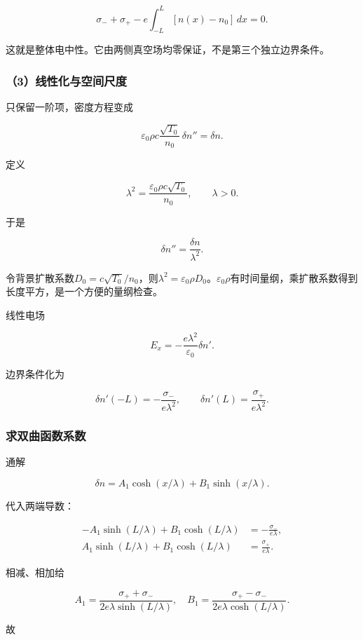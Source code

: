\documentclass[12pt,a4paper,fontset=fandol]{ctexart}
\begin{document}
\[
\sigma_-+\sigma_+-e\int_{-L}^L[n(x)-n_0]\,dx=0.
\]

这就是整体电中性。它由两侧真空场均零保证，不是第三个独立边界条件。

\subsubsection{（3）线性化与空间尺度}\label{ux7ebfux6027ux5316ux4e0eux7a7aux95f4ux5c3aux5ea6}

只保留一阶项，密度方程变成

\[
\varepsilon_0\rho c\frac{\sqrt{T_0}}{n_0}\,
\delta n''=\delta n.
\]

定义

\[
\boxed{
\lambda^2=\frac{\varepsilon_0\rho c\sqrt{T_0}}{n_0}},
\qquad \lambda>0.
\]

于是

\[
\boxed{\delta n''=\frac{\delta n}{\lambda^2}}.
\]

令背景扩散系数\(D_0=c\sqrt{T_0}/n_0\)，则\(\lambda^2=\varepsilon_0\rho D_0\)。\(\varepsilon_0\rho\)有时间量纲，乘扩散系数得到长度平方，是一个方便的量纲检查。

线性电场

\[
E_x=-\frac{e\lambda^2}{\varepsilon_0}\delta n'.
\]

边界条件化为

\[
\delta n'(-L)=-\frac{\sigma_-}{e\lambda^2},
\qquad
\delta n'(L)=\frac{\sigma_+}{e\lambda^2}.
\]

\subsubsection{求双曲函数系数}\label{ux6c42ux53ccux66f2ux51fdux6570ux7cfbux6570}

通解

\[
\delta n=A_1\cosh(x/\lambda)+B_1\sinh(x/\lambda).
\]

代入两端导数：

\[
\begin{aligned}
-A_1\sinh(L/\lambda)+B_1\cosh(L/\lambda)
&=-\frac{\sigma_-}{e\lambda},\\
A_1\sinh(L/\lambda)+B_1\cosh(L/\lambda)
&=\frac{\sigma_+}{e\lambda}.
\end{aligned}
\]

相减、相加给

\[
A_1=\frac{\sigma_++\sigma_-}{2e\lambda\sinh(L/\lambda)},
\quad
B_1=\frac{\sigma_+-\sigma_-}{2e\lambda\cosh(L/\lambda)}.
\]

故
\end{document}
